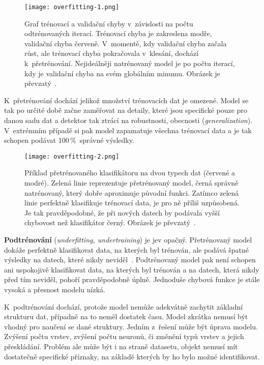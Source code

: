 \begin{figure}[H]
    \centering
    \texttt{[image: overfitting-1.png]}
    \caption[Příznaky přetrénování]{Graf trénovací a validační chyby v~závislosti na počtu odtrénovaných iterací. Trénovací chyba je zakreslena modře, validační chyba červeně. V~momentě, kdy validační chyba začala růst, ale trénovací chyba pokračovala v~klesání, dochází k~přetrénování. Nejideálněji natrénovaný model je po počtu iterací, kdy je validační chyba na svém globálním minumu. Obrázek je převzatý~\cite{wikiOverfitting}.}
    \label{fig_overfitting-1}
\end{figure}

K~přetrénování dochází jelikož množství trénovacích dat je omezené. Model se tak po určité době začne zaměřovat na detaily, které jsou specifické pouze pro danou sadu dat a detektor tak ztrácí na robustnosti, obecnosti (\textit{generalization}). V~extrémním případě si pak model zapamatuje všechna trénovací data a je tak schopen podávat 100\,\%~správné výsledky.

\begin{figure}[H]
    \centering
    \texttt{[image: overfitting-2.png]}
    \caption[Příklad přetrénovaného klasifikátoru]{Příklad přetrénovaného klasifikátoru na dvou typech dat (červené a modré). Zelená linie reprezentuje přetrénovaný model, černá správně natrénovaný, který dobře aproximuje původní funkci. Zatímco zelená linie perfektně klasifikuje trénovací data, je pro ně příliš uzpůsobená. Je tak pravděpodobné, že při nových datech by podávala vyšší chybovost než klasifikátor černý. Obrázek je převzatý~\cite{wikiOverfitting}.}
    \label{fig_overfitting-2}
\end{figure}

\textbf{Podtrénování} (\textit{underfitting, undertraining}) je jev opačný. Přetrénovaný model dokáže perfektně klasifikovat data, na kterých byl trénován, ale podává špatné výsledky na datech, které nikdy neviděl~\cite{wikiOverfitting}. Podtrénovaný model pak není schopen ani uspokojivě klasifikovat data, na kterých byl trénován a na datech, která nikdy před tím neviděl, pohoří pravděpodobně úplně. Jednoduše chybová funkce je stále vysoká a přesnost modelu nízká.

K~podtrénování dochází, protože model nemůže adekvátně zachytit základní strukturu dat, případně na to neměl dostatek času. Model zkrátka nemusí být vhodný pro naučení se dané struktury. Jedním z~řešení může být úprava modelu. Zvýšení počtu vrstev, zvýšení počtu neuronů, či změnění typů vrstev a jejich přeskládání. Problém ale může být i na straně datasetu, objekt nemusí mít dostatečně specifické příznaky, na základě kterých by ho bylo možné identifikovat.

